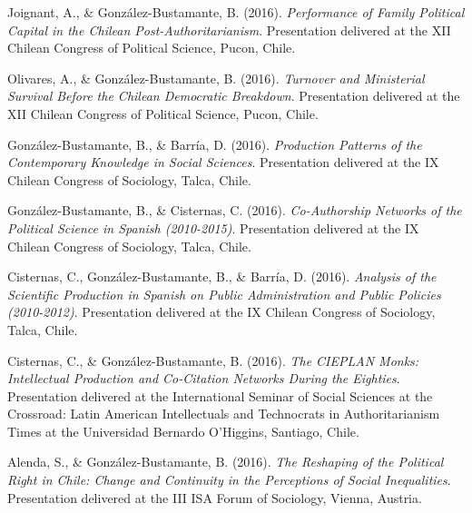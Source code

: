 \begin{publications}
\begin{benumerate}{77}
\item{\small Joignant, A., \& González-Bustamante, B. (2016). {\itshape Performance of Family Political Capital in the Chilean Post-Authoritarianism}. Presentation delivered at the XII Chilean Congress of Political Science, Pucon, Chile.}\vspace{1mm}

\item{\small Olivares, A., \& González-Bustamante, B. (2016). {\itshape Turnover and Ministerial Survival Before the Chilean Democratic Breakdown}. Presentation delivered at the XII Chilean Congress of Political Science, Pucon, Chile.}\vspace{1mm}

\item{\small González-Bustamante, B., \& Barría, D. (2016). {\itshape Production Patterns of the Contemporary Knowledge in Social Sciences}. Presentation delivered at the IX Chilean Congress of Sociology, Talca, Chile.}\vspace{1mm}

\item{\small González-Bustamante, B., \& Cisternas, C. (2016). {\itshape Co-Authorship Networks of the Political Science in Spanish (2010-2015)}. Presentation delivered at the IX Chilean Congress of Sociology, Talca, Chile.}\vspace{1mm}

\item{\small Cisternas, C., González-Bustamante, B., \& Barría, D. (2016). {\itshape Analysis of the Scientific Production in Spanish on Public Administration and Public Policies (2010-2012)}. Presentation delivered at the IX Chilean Congress of Sociology, Talca, Chile.}\vspace{1mm}

\item{\small Cisternas, C., \& González-Bustamante, B. (2016). {\itshape The CIEPLAN Monks: Intellectual Production and Co-Citation Networks During the Eighties}. Presentation delivered at the International Seminar of Social Sciences at the Crossroad: Latin American Intellectuals and Technocrats in Authoritarianism Times at the Universidad Bernardo O'Higgins, Santiago, Chile.}\vspace{1mm}

\item{\small Alenda, S., \& González-Bustamante, B. (2016). {\itshape The Reshaping of the Political Right in Chile: Change and Continuity in the Perceptions of Social Inequalities}. Presentation delivered at the III ISA Forum of Sociology, Vienna, Austria.}\vspace{1mm}


\end{benumerate}
\end{publications}

